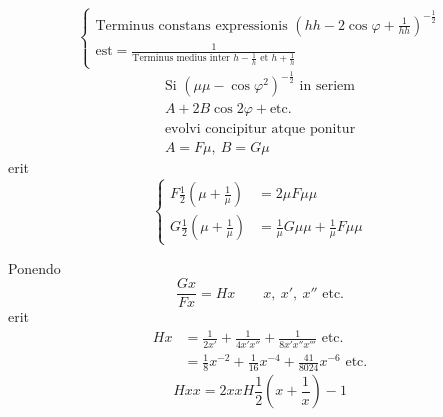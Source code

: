 \begin{equation}\tag*{[24]}\left\{\begin{gathered}
\text{Terminus constans expressionis }\left(hh-2\cos\varphi+\frac1{hh}\right)^{-\frac12}\\
\text{est}=\frac1{\text{Terminus medius inter }h-\frac1h\text{ et }h+\frac1h}
\end{gathered}\right.\end{equation}
\begin{equation}\tag*{[25]}\begin{gathered}
\text{Si }(\mu\mu-\cos\varphi^2)^{-\frac12}\text{ in seriem}\\
A+2B\cos2\varphi+\text{etc.}\\
\text{evolvi concipitur atque ponitur}\\
A=F\mu,\ B=G\mu
\end{gathered}\end{equation}
\noindent erit
\begin{equation}\tag*{[26]}\left\{\begin{aligned}
F\frac12\left(\mu+\frac1\mu\right)&=2\mu F\mu\mu\\
G\frac12\left(\mu+\frac1\mu\right)&=\frac1\mu G\mu\mu+\frac1\mu F\mu\mu
\end{aligned}\right.\end{equation}
\par\indent Ponendo
\begin{equation}\tag*{[27]}\frac{Gx}{Fx}=Hx\qquad x,\ x',\ x''\text{ etc.}\end{equation}
\noindent erit
\begin{equation}\tag*{[28]}\begin{aligned}
Hx&=\frac1{2x'}+\frac1{4x'x''}+\frac1{8x'x''x'''}\text{ etc.}\\
&=\frac18x^{-2}+\frac1{16}x^{-4}+\frac{41}{8024}x^{-6}\text{ etc.}
\end{aligned}\end{equation}
\[Hxx=2xxH\frac12\left(x+\frac1x\right)-1\]
\clearpage
\endgroup

